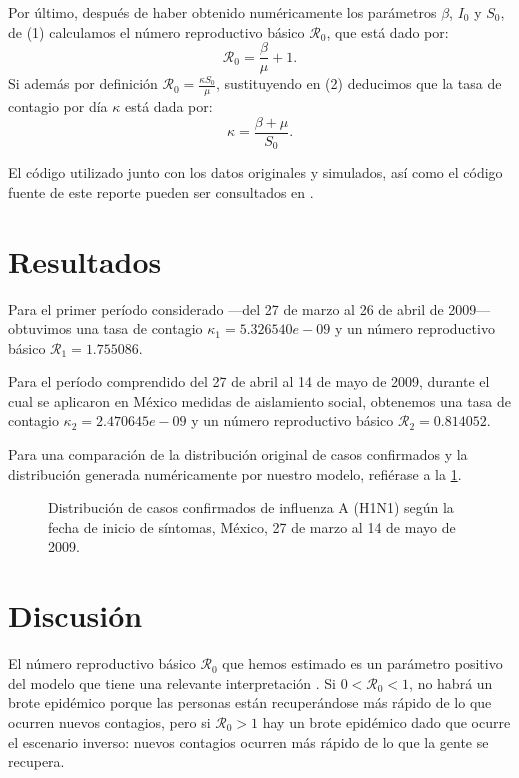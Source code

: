 \documentclass[12pt]{article}
\begin{document}
	Por último, después de haber obtenido numéricamente los parámetros $ \beta $, $ I_0 $ y $ S_0 $, de (1) calculamos el número reproductivo básico $ \mathcal{R}_0 $, que está dado por: 
	\[ \mathcal{R}_0 = \frac{\beta}{\mu} + 1. \tag{2} \]
	Si además por definición $ \mathcal{R}_0 = \frac{\kappa S_0}{\mu} $, sustituyendo en (2) deducimos que la tasa de contagio por día $ \kappa $ está dada por:
	\[ \kappa = \frac{\beta + \mu}{S_0}. \]
	\vspace{5mm}
	
	El código utilizado junto con los datos originales y simulados, así como el código fuente de este reporte pueden ser consultados en \cite{MendozaOrtiz2019}.
	
	\section{Resultados}
	
	Para el primer período considerado ---del 27 de marzo al 26 de abril de 2009--- obtuvimos una tasa de contagio $ \kappa_1 = 5.326540e-09 $ y un número reproductivo básico $ \mathcal{R}_1 = 1.755086 $. 
	
	Para el período comprendido del 27 de abril al 14 de mayo de 2009, durante el cual se aplicaron en México medidas de aislamiento social, obtenemos una tasa de contagio $ \kappa_2 = 2.470645e-09 $ y un número reproductivo básico $ \mathcal{R}_2 = 0.814052 $.
	
	Para una comparación de la distribución original de casos confirmados y la distribución generada numéricamente por nuestro modelo, refiérase a la \cref{plot:casos}.
	
	\begin{figure}
		\centering
		\caption{Distribución de casos confirmados de influenza A (H1N1) según la fecha de inicio de síntomas, México, 27 de marzo al 14 de mayo de 2009.}
		\label{plot:casos}
		
	\end{figure}
	
	\section{Discusión}
	
	El número reproductivo básico $ \mathcal{R}_0 $ que hemos estimado es un parámetro positivo del modelo que tiene una relevante interpretación \cite{Driessche2017}. Si $ 0 < \mathcal{R}_0 < 1 $, no habrá un brote epidémico porque las personas están recuperándose más rápido de lo que ocurren nuevos contagios, pero si $ \mathcal{R}_0 > 1 $ hay un brote epidémico dado que ocurre el escenario inverso: nuevos contagios ocurren más rápido de lo que la gente se recupera. 
	
\end{document}
